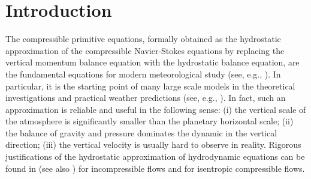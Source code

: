 \documentclass[12pt,reqno]{amsart}
\numberwithin{equation}{section}
\begin{document}



\maketitle



\allowdisplaybreaks
\section{Introduction}

The compressible primitive equations, formally obtained as the hydrostatic approximation of the compressible Navier-Stokes equations by replacing the vertical momentum balance equation with the hydrostatic balance
equation, are the fundamental equations for modern meteorological study (see, e.g., \cite[Chapter 4]{Richardson1965}). In particular, it is the starting point of many large scale
models in the theoretical investigations and practical weather predictions (see, e.g., \cite{Lions1992,JLLions1992,Washington2005}). In fact, such an approximation is reliable and useful in the following sense: (i)
the vertical scale of the atmosphere is significantly smaller than the planetary horizontal scale; (ii) the balance of gravity and pressure dominates the dynamic in the vertical direction; (iii) the vertical velocity is
usually hard to observe in reality. Rigorous justifications of the hydrostatic approximation of hydrodynamic equations can be found in \cite{Li2017,Azerad2001} (see also \cite{FugigaHHK,FuGiHiHuKaW1,FuruGigaKas,LiTitiYuan}) for incompressible flows and \cite{Liu2019} for
isentropic compressible flows.
\end{document}
